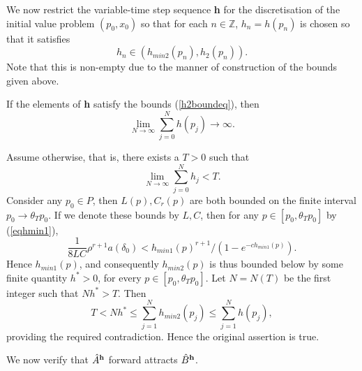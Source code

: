 We now restrict the variable-time step sequence {\bf h} for the
discretisation of the initial value problem $(p_0, x_0)$ so that for each $n
\in \mathbb{Z}$, $h_n = h(p_n)$ is chosen so that it satisfies
\begin{equation}
\label{h2boundeq}
h_n \in (h_{min2}(p_n), h_2(p_n)).
\end{equation}
Note that this is non-empty due to the manner of construction of
the bounds given above.

\begin{lemma}[A4 - Reachability]
If the elements of {\bf h} satisfy the bounds (\ref{h2boundeq}),
then
\[ \lim_{N \to \infty} \sum_{j=0}^{N} h(p_j) \to \infty. \]
\end{lemma}
\begin{prf}
Assume otherwise, that is, there exists a $T>0$ such that
\[ \lim_{N \to \infty} \sum_{j=0}^{N} h_j < T. \]
Consider any $p_0 \in P$, then $L(p), C_r(p)$ are both bounded on
the finite interval $p_0 \to \theta_T p_0$. If we denote these
bounds by $L, C$, then for any $p \in [p_0, \theta_T p_0]$
by (\ref{eqhmin1}),
\[ \frac{1}{8LC}\rho^{r+1} a(\delta_0) < h_{min1}(p)^{r+1} / (1 -
      e^{-ch_{min1}(p)}). \]
Hence $h_{min1}(p)$, and consequently $h_{min2}(p)$ is thus
bounded below by some finite quantity $h^* > 0$, for every $p \in
[p_0, \theta_T p_0]$. Let $N = N(T)$ be the first integer such
that $Nh^* > T$. Then
\[ T < Nh^* \leq \sum_{j=1}^{N}h_{min2}(p_j) \leq \sum_{j=1}^{N}h(p_j), \]
providing the required contradiction. Hence the original assertion is true.
\end{prf}

We now verify that $\hat{A}^{{\bf h}}$ forward attracts $\hat{B}^{{\bf h}}$.

